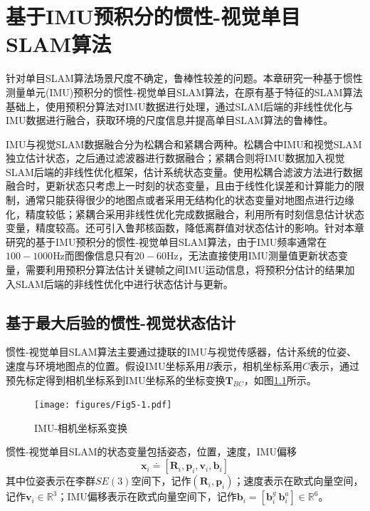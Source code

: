 
\chapter{基于IMU预积分的惯性-视觉单目SLAM算法}
\label{chap:VISLAM}
针对单目SLAM算法场景尺度不确定，鲁棒性较差的问题。本章研究一种基于惯性测量单元(IMU)预积分的惯性-视觉单目SLAM算法，在原有基于特征的SLAM算法基础上，使用预积分算法\upcite{[5.1]}对IMU数据进行处理，通过SLAM后端的非线性优化与IMU数据进行融合，获取环境的尺度信息并提高单目SLAM算法的鲁棒性。

IMU与视觉SLAM数据融合分为松耦合和紧耦合两种\upcite{[5.2]}。松耦合中IMU和视觉SLAM独立估计状态，之后通过滤波器进行数据融合；紧耦合则将IMU数据加入视觉SLAM后端的非线性优化框架，估计系统状态变量。使用松耦合滤波方法进行数据融合时，更新状态只考虑上一时刻的状态变量，且由于线性化误差和计算能力的限制，通常只能获得很少的地图点或者采用无结构化的状态变量对地图点进行边缘化，精度较低；紧耦合采用非线性优化完成数据融合，利用所有时刻信息估计状态变量，精度较高。还可引入鲁邦核函数，降低离群值对状态估计的影响。针对本章研究的基于IMU预积分的惯性-视觉单目SLAM算法，由于IMU频率通常在$100-1000$Hz而图像信息只有$20-60$Hz，无法直接使用IMU测量值更新状态变量，需要利用预积分算法估计关键帧之间IMU运动信息，将预积分估计的结果加入SLAM后端的非线性优化中进行状态估计与更新。


\section{基于最大后验的惯性-视觉状态估计}
惯性-视觉单目SLAM算法主要通过捷联的IMU与视觉传感器，估计系统的位姿、速度与环境地图点的位置。假设IMU坐标系用$B$表示，相机坐标系用$C$表示，通过预先标定得到相机坐标系到IMU坐标系的坐标变换$\boldsymbol{T}_{BC}$，如图\ref{fig5.1}所示。

\begin{figure}
\centering
\texttt{[image: figures/Fig5-1.pdf]}
\caption{IMU-相机坐标系变换}
\label{fig5.1}
\end{figure}

惯性-视觉单目SLAM的状态变量包括姿态，位置，速度，IMU偏移
\begin{equation}
\label{equ5.1}
\boldsymbol{x}_i \doteq \left[ \boldsymbol{R}_i,\boldsymbol{p}_i,\boldsymbol{v}_i,\boldsymbol{b}_i \right]
\end{equation}
其中位姿表示在李群$SE(3)$空间下，记作$\left( \boldsymbol{R}_i, \boldsymbol{p}_i \right)$；速度表示在欧式向量空间，记作$\boldsymbol{v}_i \in \mathds{R}^3 $；IMU偏移表示在欧式向量空间下，记作$\boldsymbol{b}_i=[\boldsymbol{b}_i^g \ \boldsymbol{b}_i^a] \in \mathds{R}^6$。

